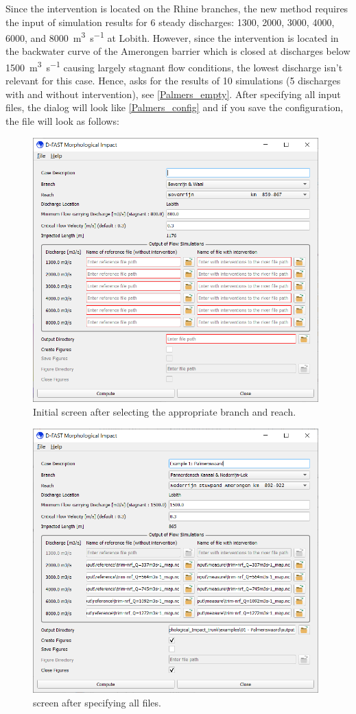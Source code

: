 Since the intervention is located on the Rhine branches, the new \dfastmi method requires the input of simulation results for 6 steady discharges: 1300, 2000, 3000, 4000, 6000, and \SI{8000}{\metre\cubed\per\second} at Lobith.
However, since the intervention is located in the backwater curve of the Amerongen barrier which is closed at discharges below \SI{1500}{\metre\cubed\per\second} causing largely stagnant flow conditions, the lowest discharge isn't relevant for this case.
Hence, \dfmi asks for the results of 10 simulations (5 discharges with and without intervention), see \autoref{Palmers_empty}.
After specifying all input files, the dialog will look like \autoref{Palmers_config} and if you save the configuration, the file will look as follows:

\begin{figure}
\center
\includegraphics[width=11cm]{figures/Palmerswaard_empty.png}
\caption{Initial \dfmi screen after selecting the appropriate branch and reach.}
\label{Palmers_empty}
\end{figure}

\begin{figure}
\center
\includegraphics[width=11cm]{figures/Palmerswaard_config.png}
\caption{\dfmi screen after specifying all files.}
\label{Palmers_config}
\end{figure}

